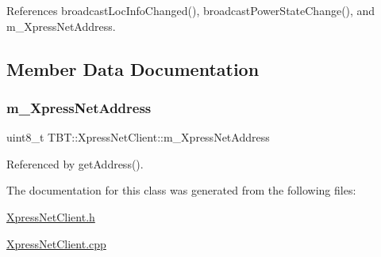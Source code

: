 References broadcast\+Loc\+Info\+Changed(), broadcast\+Power\+State\+Change(), and m\+\_\+\+Xpress\+Net\+Address.



\subsection{Member Data Documentation}
\mbox{\label{classTBT_1_1XpressNetClient_a9af9cd4bed2191d7504b8ae480182643_a9af9cd4bed2191d7504b8ae480182643}} 
\subsubsection{\texorpdfstring{m\+\_\+\+Xpress\+Net\+Address}{m\_XpressNetAddress}}
{\footnotesize\ttfamily uint8\+\_\+t T\+B\+T\+::\+Xpress\+Net\+Client\+::m\+\_\+\+Xpress\+Net\+Address\hspace{0.3cm}{\ttfamily [protected]}}



Referenced by get\+Address().



The documentation for this class was generated from the following files\+:\begin{DoxyCompactItemize}
\item 
\hyperlink{XpressNetClient_8h}{Xpress\+Net\+Client.\+h}\item 
\hyperlink{XpressNetClient_8cpp}{Xpress\+Net\+Client.\+cpp}\end{DoxyCompactItemize}
